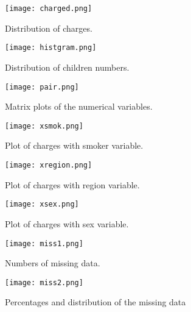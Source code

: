 \documentclass[12pt]{article}
\begin{document}
            \begin{figure}[!htbp]
            \centering
            \texttt{[image: charged.png]}
            \caption{Distribution of charges.}
            \label{fig:method}
            \end{figure}
            
            \begin{figure}[!htbp]
            \centering
            \texttt{[image: histgram.png]}
            \caption{Distribution of children numbers.}
            \label{fig:method}
            \end{figure}

            \begin{figure}[!htbp]
            \centering
            \texttt{[image: pair.png]}
            \caption{Matrix plots of the numerical variables.}
            \label{fig:method}
            \end{figure}

            \begin{figure}[!htbp]
            \centering
            \texttt{[image: xsmok.png]}
            \caption{Plot of charges with smoker variable.}
            \label{fig:method}
            \end{figure}
  
             \begin{figure}[!htbp]
            \centering
            \texttt{[image: xregion.png]}
            \caption{Plot of charges with region variable.}
            \label{fig:method}
            \end{figure}

            \begin{figure}[!htbp]
            \centering
            \texttt{[image: xsex.png]}
            \caption{Plot of charges with sex variable.}
            \label{fig:method}
            \end{figure}
            
            \begin{figure}[!htbp]
            \centering
            \texttt{[image: miss1.png]}
            \caption{Numbers of missing data.}
            \label{fig:method}
            \end{figure}

            \begin{figure}[!htbp]
            \centering
            \texttt{[image: miss2.png]}
            \caption{Percentages and distribution of the missing data}
            \label{fig:method}
            \end{figure}
 
\end{document}
